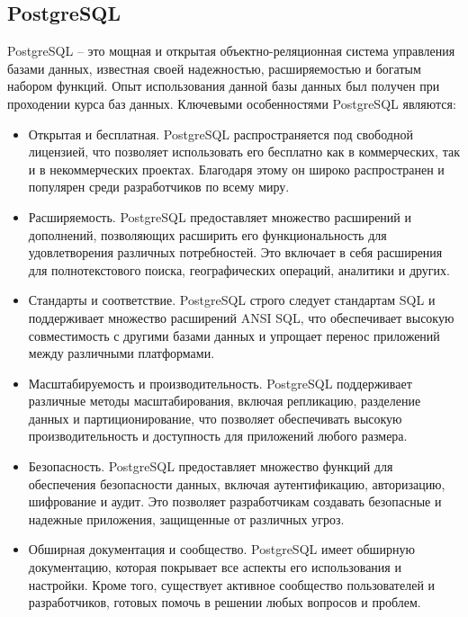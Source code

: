 

\subsection{PostgreSQL}\label{subsec:domain:postgresql}
PostgreSQL -- это мощная и открытая объектно-реляционная система управления базами данных, известная своей надежностью, расширяемостью и богатым набором функций.
Опыт использования данной базы данных был получен при проходении курса баз данных.
Ключевыми особенностями PostgreSQL являются:
\begin{itemize}
    \item Открытая и бесплатная.
    PostgreSQL распространяется под свободной лицензией, что позволяет использовать его бесплатно как в коммерческих, так и в некоммерческих проектах.
    Благодаря этому он широко распространен и популярен среди разработчиков по всему миру.
    \item Расширяемость.
    PostgreSQL предоставляет множество расширений и дополнений, позволяющих расширить его функциональность для удовлетворения различных потребностей.
    Это включает в себя расширения для полнотекстового поиска, географических операций, аналитики и других.
    \item Стандарты и соответствие.
    PostgreSQL строго следует стандартам SQL и поддерживает множество расширений ANSI SQL, что обеспечивает высокую совместимость с другими базами данных и упрощает перенос приложений между различными платформами.
    \item Масштабируемость и производительность.
    PostgreSQL поддерживает различные методы масштабирования, включая репликацию, разделение данных и партиционирование, что позволяет обеспечивать высокую производительность и доступность для приложений любого размера.
    \item Безопасность.
    PostgreSQL предоставляет множество функций для обеспечения безопасности данных, включая аутентификацию, авторизацию, шифрование и аудит.
    Это позволяет разработчикам создавать безопасные и надежные приложения, защищенные от различных угроз.
    \item Обширная документация и сообщество.
    PostgreSQL имеет обширную документацию, которая покрывает все аспекты его использования и настройки.
    Кроме того, существует активное сообщество пользователей и разработчиков, готовых помочь в решении любых вопросов и проблем.
\end{itemize}

